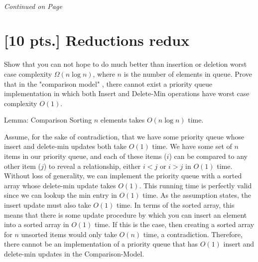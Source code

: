 \documentclass[11pt]{article}
\begin{document}
\label{pg:end-of-p1}
%
\paragraph{} \emph{Continued on Page \pageref{pg:p1-continuation}}

\newpage

\pagestyle{plain}

\section{[10 pts.] Reductions redux}

Show that you can not hope to do much better than insertion 
or deletion worst case complexity $\Omega(n \log n)$, where $n$ is the 
number of elements in queue. Prove that in the "comparison model"
, there cannot exist a priority queue implementation in which
both Insert and Delete-Min operations have worst case complexity $O(1)$. 
 
Lemma: Comparison Sorting $n$ elements takes $O(n\log n)$ time. 

Assume, for the sake of contradiction, that we have some priority queue whose
insert and delete-min updates both take $O(1)$ time. 
We have some set of $n$ items in our priority queue, and 
each of these items ($i$) can be compared to any other item ($j$) to reveal a
relationship, either $i<j$ or $i>j$ in $O(1)$ time. 
Without loss of generality, we can implement the priority queue with a sorted
array whose delete-min update takes $O(1)$. This running time is perfectly valid
since we can lookup the min entry in $O(1)$ time. As the assumption states, the 
insert update must also take $O(1)$ time. In terms of the sorted array, this means
that there is some update procedure by which you can insert an element into a sorted
array in $O(1)$ time. If this is the case, then creating a sorted array for
$n$ unsorted items would only take $O(n)$ time, a contradiction. Therefore, 
there cannot be an implementation of a priority queue that has $O(1)$ insert and
delete-min updates in the Comparison-Model. 

\label{pg:end-of-p2}
%
\end{document}
